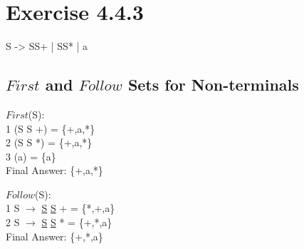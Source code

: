 \documentclass[letterpaper, 10pt,DIV=13]{scrartcl}
\numberwithin{equation}{section} %
\numberwithin{figure}{section} %
\numberwithin{table}{section} %
\begin{document}


\section{Exercise 4.4.3}
S -> SS+ | SS* | a

\subsection{$First$ and $Follow$ Sets for Non-terminals}
$First$(S): \\
1 (S S +) = \{+,a,*\} \\
2 (S S *) = \{+,a,*\} \\
3 (a) = \{a\}\\
Final Answer: \{+,a,*\}

$Follow$(S): \\
1 S $\rightarrow$ \underline{S} \underline{S} + = \{*,+,a\}\\
2 S $\rightarrow$ \underline{S} \underline{S} * = \{+,*,a\}\\
Final Answer: \{+,*,a\}


\pagebreak
\end{document}
